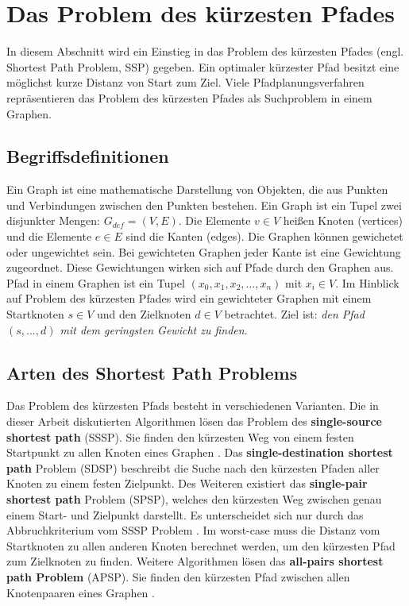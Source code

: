 \chapter{Das Problem des kürzesten Pfades}

In diesem Abschnitt wird ein Einstieg in das Problem des kürzesten Pfades (engl. Shortest Path Problem, SSP) gegeben. Ein optimaler kürzester Pfad besitzt eine möglichst kurze Distanz von Start zum Ziel\cite{Madkour.2017}. Viele Pfadplanungsverfahren repräsentieren das Problem des kürzesten Pfades als Suchproblem in einem Graphen.


\section{Begriffsdefinitionen}

Ein Graph ist eine mathematische Darstellung von Objekten, die aus Punkten und Verbindungen zwischen den Punkten bestehen. Ein Graph ist ein Tupel zwei disjunkter Mengen: $G_{def}= (V,E)$. Die Elemente $v \in V$ heißen Knoten (vertices) und die Elemente $e \in E$ sind die Kanten (edges). Die Graphen können gewichetet oder ungewichtet sein. Bei gewichteten Graphen jeder Kante ist eine Gewichtung zugeordnet. Diese Gewichtungen wirken sich auf Pfade durch den Graphen aus\cite{Gross.2004}. Pfad in einem Graphen ist ein Tupel $\left ( x_{0}, x_{1}, x_{2}, ..., x_{n} \right )$ mit $x_{i} \in V$.  Im Hinblick auf Problem des kürzesten Pfades wird ein gewichteter Graphen mit einem Startknoten $s \in V$ und den Zielknoten $d \in V$ betrachtet. Ziel ist: \textit{den Pfad  $\left ( s, ..., d \right )$ mit dem geringsten Gewicht zu finden}\cite{Madkour.2017}. 

\section{Arten des Shortest Path Problems}

Das Problem des kürzesten Pfads besteht in verschiedenen Varianten. Die in dieser Arbeit diskutierten Algorithmen lösen das Problem des \textbf{single-source shortest path} (SSSP). Sie finden den kürzesten Weg von einem festen Startpunkt zu allen Knoten eines Graphen \cite{Gu.2018}. Das \textbf{single-destination shortest path} Problem (SDSP)  beschreibt die Suche nach den kürzesten Pfaden aller Knoten zu einem festen Zielpunkt. Des Weiteren existiert das \textbf{single-pair shortest path} Problem (SPSP), welches den kürzesten Weg zwischen genau einem Start- und Zielpunkt darstellt. Es unterscheidet sich nur durch das Abbruchkriterium vom SSSP Problem \cite{Ottmann.2017}. Im worst-case muss die Distanz vom Startknoten zu allen anderen Knoten berechnet werden, um den kürzesten Pfad zum Zielknoten zu finden. Weitere Algorithmen lösen das \textbf{all-pairs shortest path Problem} (APSP). Sie finden den kürzesten Pfad zwischen allen Knotenpaaren eines Graphen \cite{Cormen.2009}.
